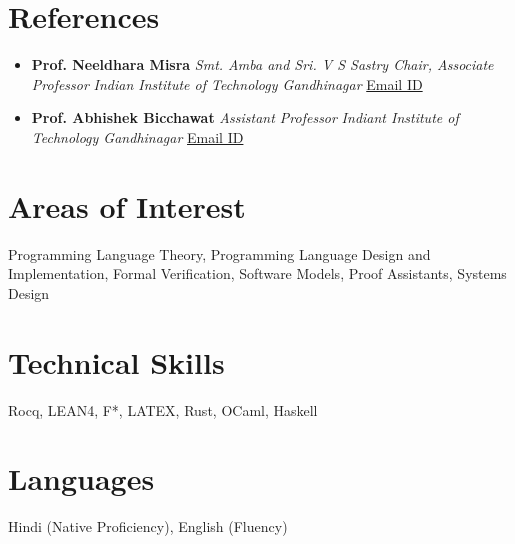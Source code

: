 \documentclass{moderncv}
\begin{document}
\section{References}
\label{sec:org7fe9ecd}
\begin{itemize}
\item \textbf{Prof. Neeldhara Misra}
\emph{Smt. Amba and Sri. V S Sastry Chair, Associate Professor}
\emph{Indian Institute of Technology Gandhinagar}
\href{mailto:neeldhara.m@iitgn.ac.in}{Email ID}
\item \textbf{Prof. Abhishek Bicchawat}
\emph{Assistant Professor}
\emph{Indiant Institute of Technology Gandhinagar}
\href{mailto:abhishek.b@iitgn.ac.in}{Email ID}
\end{itemize}
\section{Areas of Interest}
\label{sec:orgfe784df}
Programming Language Theory, Programming Language Design and Implementation, Formal Verification, Software Models, Proof Assistants, Systems Design
\section{Technical Skills}
\label{sec:orgd8bd9cd}
Rocq, LEAN4, F*, LATEX, Rust, OCaml, Haskell
\section{Languages}
\label{sec:org3d7ec6c}
Hindi (Native Proficiency), English (Fluency)
\end{document}
